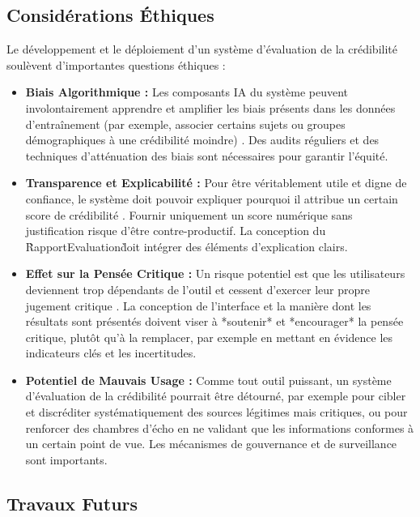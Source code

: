 \documentclass[9pt,twocolumn,french]{article}
\begin{document}
\subsection{Considérations Éthiques}

Le développement et le déploiement d'un système d'évaluation de la crédibilité soulèvent d'importantes questions éthiques :
\begin{itemize}
    \item \textbf{Biais Algorithmique :} Les composants IA du système peuvent involontairement apprendre et amplifier les biais présents dans les données d'entraînement (par exemple, associer certains sujets ou groupes démographiques à une crédibilité moindre) \citep{Menzner2018Biasscanner, Chen2019Detecting}. Des audits réguliers et des techniques d'atténuation des biais sont nécessaires pour garantir l'équité.
    \item \textbf{Transparence et Explicabilité :} Pour être véritablement utile et digne de confiance, le système doit pouvoir expliquer pourquoi il attribue un certain score de crédibilité \citep{Ahmed2025Aidriven, Loth2024}. Fournir uniquement un score numérique sans justification risque d'être contre-productif. La conception du \`RapportEvaluation\` doit intégrer des éléments d'explication clairs.
    \item \textbf{Effet sur la Pensée Critique :} Un risque potentiel est que les utilisateurs deviennent trop dépendants de l'outil et cessent d'exercer leur propre jugement critique \citep{Nabozny2021}. La conception de l'interface et la manière dont les résultats sont présentés doivent viser à *soutenir* et *encourager* la pensée critique, plutôt qu'à la remplacer, par exemple en mettant en évidence les indicateurs clés et les incertitudes.
    \item \textbf{Potentiel de Mauvais Usage :} Comme tout outil puissant, un système d'évaluation de la crédibilité pourrait être détourné, par exemple pour cibler et discréditer systématiquement des sources légitimes mais critiques, ou pour renforcer des chambres d'écho en ne validant que les informations conformes à un certain point de vue. Les mécanismes de gouvernance et de surveillance sont importants.
\end{itemize}

\subsection{Travaux Futurs}
\end{document}
